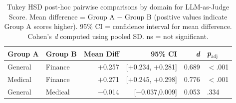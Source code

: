 \begin{table}[h]
\centering
\caption{Tukey HSD post-hoc pairwise comparisons by domain for LLM-as-Judge Score. Mean difference = Group A $-$ Group B (positive values indicate Group A scores higher). 95\% CI = confidence interval for mean difference. Cohen's \textit{d} computed using pooled SD. ns = not significant.}
\label{tab:tukey_domain}
\begin{tabular}{llrrrl}
\toprule
\textbf{Group A} & \textbf{Group B} & \textbf{Mean Diff} & \textbf{95\% CI} & \textbf{\textit{d}} & \textbf{\textit{p}$_{\text{adj}}$} \\
\midrule
General & Finance & $+$0.257 & [$+$0.234, $+$0.281] & 0.689 & $<$.001 \\
Medical & Finance & $+$0.271 & [$+$0.245, $+$0.298] & 0.776 & $<$.001 \\
General & Medical & $-$0.014 & [$-$0.037,\hphantom{$-$}0.009] & 0.053 & .334 \\
\bottomrule
\end{tabular}
\end{table}
